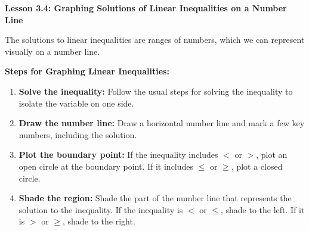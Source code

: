  \begin{center}
\textbf{Lesson 3.4: Graphing Solutions of Linear Inequalities on a Number Line}
\end{center}

\vspace*{1ex}

The solutions to linear inequalities are ranges of numbers, which we can represent visually on a number line.

\noindent\textbf{Steps for Graphing Linear Inequalities:}
\begin{enumerate}[noitemsep, label = \color{blue}\arabic*. ]
    \item \textbf{Solve the inequality:} Follow the usual steps for solving the inequality to isolate the variable on one side.
    \item \textbf{Draw the number line:} Draw a horizontal number line and mark a few key numbers, including the solution.
    \item \textbf{Plot the boundary point:} If the inequality includes $<$ or $>$, plot an open circle at the boundary point. If it includes $\leq$ or $\geq$, plot a closed circle.
    \item \textbf{Shade the region:} Shade the part of the number line that represents the solution to the inequality. If the inequality is $<$ or $\leq$, shade to the left. If it is $>$ or $\geq$, shade to the right.
\end{enumerate}



